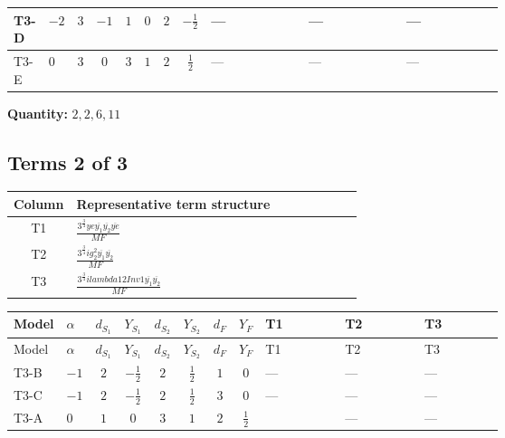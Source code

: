 \documentclass[8pt]{article}
\begin{document}
\begin{landscape}
\begin{longtable}{@{}llcccccc >{\raggedright\arraybackslash}p{0.21\linewidth} >{\raggedright\arraybackslash}p{0.21\linewidth} >{\raggedright\arraybackslash}p{0.21\linewidth}@{}}
\midrule
T3-D & $-2$ & $3$ & $-1$ & $1$ & $0$ & $2$ & $-\frac{1}{2}$ & --- & --- & --- \\
\midrule
T3-E & $0$ & $3$ & $0$ & $3$ & $1$ & $2$ & $\frac{1}{2}$ & --- & --- & --- \\
\midrule
\bottomrule
\end{longtable}
\clearpage
\noindent\textbf{Quantity: }$\mathrm{2,2,6,11}$\par\smallskip
\subsection*{Terms 2 of 3}
\begin{center}
\begin{tabular}{@{}c >{\raggedright\arraybackslash}p{0.82\linewidth}@{}}
\toprule
Column & Representative term structure \\
\midrule
T1 & \(\displaystyle \frac{3^{\frac{3}{4}} ye \overline{y_{1}} \overline{y_{2}} \overline{ye}}{MF}\) \\
\midrule
T2 & \(\displaystyle \frac{3^{\frac{3}{4}} i g_{2}^{2} \overline{y_{1}} \overline{y_{2}}}{MF}\) \\
\midrule
T3 & \(\displaystyle \frac{3^{\frac{3}{4}} i lambda12Inv1 \overline{y_{1}} \overline{y_{2}}}{MF}\) \\
\midrule
\bottomrule
\end{tabular}
\end{center}
\smallskip
\tiny
\begin{longtable}{@{}llcccccc >{\raggedright\arraybackslash}p{0.21\linewidth} >{\raggedright\arraybackslash}p{0.21\linewidth} >{\raggedright\arraybackslash}p{0.21\linewidth}@{}}
\toprule
Model & $\alpha$ & $d_{S_1}$ & $Y_{S_1}$ & $d_{S_2}$ & $Y_{S_2}$ & $d_F$ & $Y_F$ & T1 & T2 & T3 \\
\midrule
\endfirsthead
\toprule
Model & $\alpha$ & $d_{S_1}$ & $Y_{S_1}$ & $d_{S_2}$ & $Y_{S_2}$ & $d_F$ & $Y_F$ & T1 & T2 & T3 \\
\midrule
\endhead
T3-B & $-1$ & $2$ & $-\frac{1}{2}$ & $2$ & $\frac{1}{2}$ & $1$ & $0$ & --- & --- & --- \\
\midrule
T3-C & $-1$ & $2$ & $-\frac{1}{2}$ & $2$ & $\frac{1}{2}$ & $3$ & $0$ & --- & --- & --- \\
\midrule
T3-A & $0$ & $1$ & $0$ & $3$ & $1$ & $2$ & $\frac{1}{2}$ & \scriptsize\adjustbox{max width=\linewidth}{$\begin{gathered} \frac{3^{\frac{3}{4}} ye \overline{y_{1}} \overline{y_{2}} \overline{ye}}{12 MF}\end{gathered}$} & --- & --- \\

\end{longtable}
\end{landscape}
\end{document}

